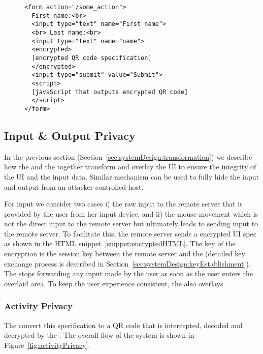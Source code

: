 \begin{figure}[t]
\small
\begin{lstlisting}[mathescape=true]
<form action="/some_action">
  First name:<br>
  <input type="text" name="First name">
  <br> Last name:<br>
  <input type="text" name="name">
  <encrypted>
  [encrypted QR code specification]
  </encrypted>
  <input type="submit" value="Submit">
  <script>
  [javaScript that outputs encrypted QR code]
  </script>
</form> 
\end{lstlisting} 
\end{figure}


\subsection{Input \& Output Privacy}
\label{sec:systemDesign:mousePrivacy}


In the previous section (Section~\ref{sec:systemDesign:transformation}) we describe how the \name \js and the \device together transform and overlay the UI to ensure the integrity of the UI and the input data. Similar mechanism can be used to fully hide the input and output from an attacker-controlled host. 

For input we consider two cases i) the raw input to the remote server that is provided by the user from her input device, and ii) the mouse movement which is not the direct input to the remote server but ultimately leads to sending input to the remote server. To facilitate this, the remote server sends a encrypted UI spec as shown in the HTML snippet~\ref{snippet:encryptedHTML}. The key of the encryption is the session \tls key between the remote server and the \device (detailed key exchange process is described in Section~\ref{sec:systemDesign:keyEstablishment}). The \device stops forwarding any input made by the user as soon as the user enters the overlaid area. To keep the user experience consistent, the \device also overlays  

\subsubsection{Activity Privacy}

The \name \js convert this specification to a QR code that is intercepted, decoded and decrypted by the \device. The overall flow of the system is shown in Figure~\ref{fig:activityPrivacy}.  


